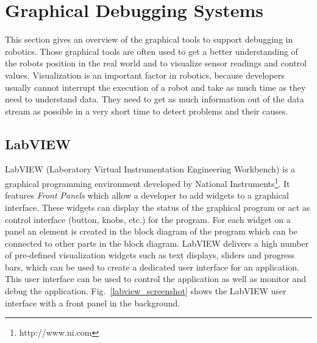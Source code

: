 
\section{Graphical Debugging Systems}
This section gives an overview of the graphical tools to support debugging in robotics. Those graphical tools are often used to get a better understanding of the robots position in the real world and to visualize sensor readings and control values. Visualization is an important factor in robotics, because developers usually cannot interrupt the execution of a robot and take as much time as they need to understand data. They need to get as much information out of the data stream as possible in a very short time to detect problems and their causes.

\subsection{LabVIEW}

LabVIEW (Laboratory Virtual Instrumentation Engineering Workbench) is a graphical programming environment developed by National Instruments\footnote{http://www.ni.com}. It features \emph{Front Panels} which allow a developer to add widgets to a graphical interface. These widgets can display the status of the graphical program or act as control interface (button, knobs, etc.) for the program. For each widget on a panel an element is created in the block diagram of the program which can be connected to other parts in the block diagram. LabVIEW delivers a high number of pre-defined visualization widgets such as text displays, sliders and progress bars, which can be used to create a dedicated user interface for an application. This user interface can be used to control the application as well as monitor and debug the application. Fig.~\ref{labview_screenshot} shows the LabVIEW user interface with a front panel in the background.

